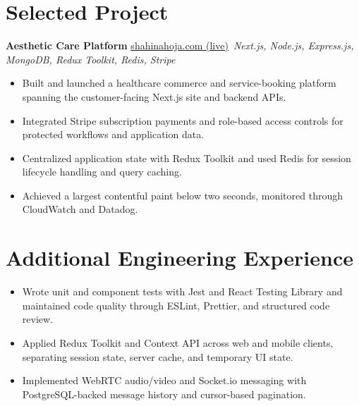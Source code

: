 \documentclass[11pt,a4paper,sans]{moderncv}
\begin{document}
\vspace{3pt}


\section{Selected Project}
\vspace{1pt}
\textbf{Aesthetic Care Platform} \hfill \href{https://shahinahoja.com/}{shahinahoja.com (live)}\
\textit{Next.js, Node.js, Express.js, MongoDB, Redux Toolkit, Redis, Stripe}
\begin{itemize}
\item {Built and launched a healthcare commerce and service-booking platform spanning the customer-facing Next.js site and backend APIs.}
\item {Integrated Stripe subscription payments and role-based access controls for protected workflows and application data.}
\item {Centralized application state with Redux Toolkit and used Redis for session lifecycle handling and query caching.}
\item {Achieved a largest contentful paint below two seconds, monitored through CloudWatch and Datadog.}
\end{itemize}

\section{Additional Engineering Experience}
\vspace{1pt}
\begin{itemize}
    \item {Wrote unit and component tests with Jest and React Testing Library and maintained code quality through ESLint, Prettier, and structured code review.}
    \item {Applied Redux Toolkit and Context API across web and mobile clients, separating session state, server cache, and temporary UI state.}
    \item {Implemented WebRTC audio/video and Socket.io messaging with PostgreSQL-backed message history and cursor-based pagination.}
\end{itemize}
\end{document}

